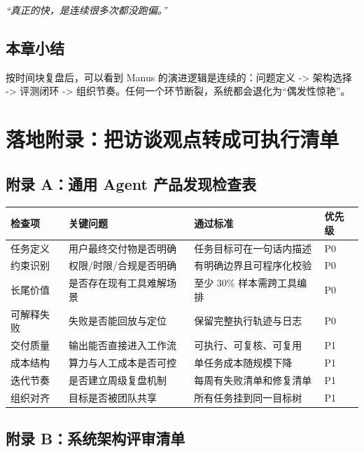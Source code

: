 \documentclass[a4paper]{article}
\begin{document}
\textit{``真正的快，是连续很多次都没跑偏。''}

\subsection{本章小结}

按时间块复盘后，可以看到 Manus 的演进逻辑是连续的：问题定义 -> 架构选择 -> 评测闭环 -> 组织节奏。任何一个环节断裂，系统都会退化为“偶发性惊艳”。


\section{落地附录：把访谈观点转成可执行清单}

\subsection{附录 A：通用 Agent 产品发现检查表}

\begin{center}
\begin{tabular}{p{3.1cm}p{3.4cm}p{5.8cm}p{2.2cm}}
\toprule
检查项 & 关键问题 & 通过标准 & 优先级 \\
\midrule
任务定义 & 用户最终交付物是否明确 & 任务目标可在一句话内描述 & P0 \\
约束识别 & 权限/时限/合规是否明确 & 有明确边界且可程序化校验 & P0 \\
长尾价值 & 是否存在现有工具难解场景 & 至少 30\% 样本需跨工具编排 & P0 \\
可解释失败 & 失败是否能回放与定位 & 保留完整执行轨迹与日志 & P0 \\
交付质量 & 输出能否直接进入工作流 & 可执行、可复核、可复用 & P1 \\
成本结构 & 算力与人工成本是否可控 & 单任务成本随规模下降 & P1 \\
迭代节奏 & 是否建立周级复盘机制 & 每周有失败清单和修复清单 & P1 \\
组织对齐 & 目标是否被团队共享 & 所有任务挂到同一目标树 & P1 \\
\bottomrule
\end{tabular}
\end{center}

\subsection{附录 B：系统架构评审清单}
\end{document}
